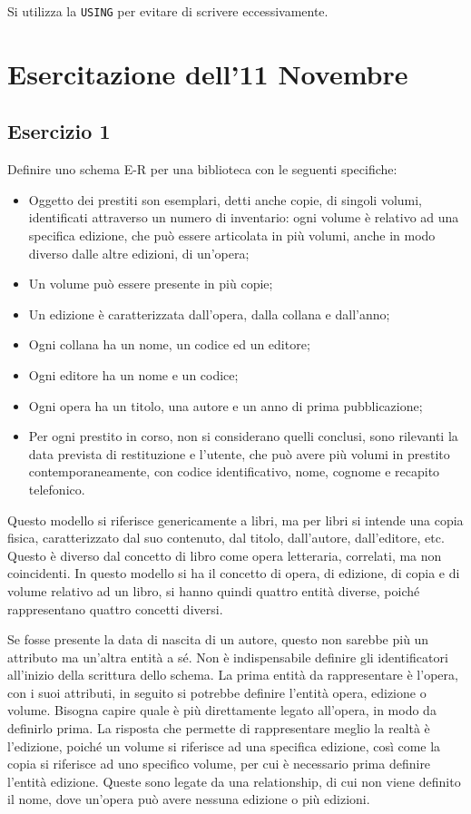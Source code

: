 \documentclass{article}
\numberwithin{equation}{subsection}
\begin{document}
Si utilizza la \verb|USING| per evitare di scrivere eccessivamente. 

\clearpage

\section{Esercitazione dell'11 Novembre}

\subsection{Esercizio 1}

Definire uno schema E-R per una biblioteca con le seguenti specifiche:
\begin{itemize}
    \item Oggetto dei prestiti son esemplari, detti anche copie, di singoli volumi, identificati attraverso un numero di inventario: ogni volume
è relativo ad una specifica edizione, che può essere articolata in più volumi, anche in modo diverso dalle altre edizioni, di un'opera; 
    \item Un volume può essere presente in più copie;
    \item Un edizione è caratterizzata dall'opera, dalla collana e dall'anno;
    \item Ogni collana ha un nome, un codice ed un editore;
    \item Ogni editore ha un nome e un codice;
    \item Ogni opera ha un titolo, una autore e un anno di prima pubblicazione;
    \item Per ogni prestito in corso, non si considerano quelli conclusi, sono rilevanti la data prevista di restituzione e l'utente, che può avere più volumi in 
prestito contemporaneamente, con codice identificativo, nome, cognome e recapito telefonico. 
\end{itemize}


Questo modello si riferisce genericamente a libri, ma per libri si intende una copia fisica, caratterizzato dal suo contenuto, dal titolo, dall'autore, dall'editore, etc. 
Questo è diverso dal concetto di libro come opera letteraria, correlati, ma non coincidenti. In questo modello si ha il concetto di opera, di edizione, di copia e di 
volume relativo ad un libro, si hanno quindi quattro entità diverse, poiché rappresentano quattro concetti diversi. 

Se fosse presente la data di nascita di un autore, questo non sarebbe più un attributo ma un'altra entità a sé. Non è indispensabile definire gli identificatori 
all'inizio della scrittura dello schema. La prima entità da rappresentare è l'opera, con i suoi attributi, in seguito si potrebbe definire l'entità opera, edizione o 
volume. Bisogna capire quale è più direttamente legato all'opera, in modo da definirlo prima. La risposta che permette di rappresentare meglio la realtà è l'edizione, 
poiché un volume si riferisce ad una specifica edizione, così come la copia si riferisce ad uno specifico volume, per cui è necessario prima definire l'entità 
edizione. Queste sono legate da una relationship, di cui non viene definito il nome, dove un'opera può avere nessuna edizione o più edizioni. 
\end{document}
